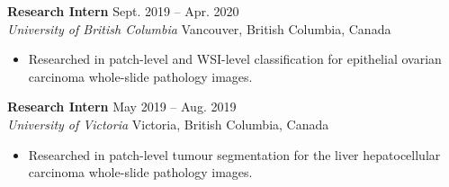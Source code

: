\documentclass[11pt]{res} %
\begin{document}
\begin{resume}
\textbf{Research Intern} \hfill Sept. 2019 -- Apr. 2020\\
\textit{University of British Columbia} \hfill Vancouver, British Columbia, Canada
\begin{itemize} \itemsep -2pt %
\item Researched in patch-level and WSI-level classification for epithelial ovarian carcinoma whole-slide pathology images.
\end{itemize}

\textbf{Research Intern} \hfill May 2019 -- Aug. 2019\\
\textit{University of Victoria} \hfill Victoria, British Columbia, Canada
\begin{itemize} \itemsep -2pt %
\item Researched in patch-level tumour segmentation for the liver hepatocellular carcinoma whole-slide pathology images. 
\end{itemize}







\end{resume}
\end{document}
